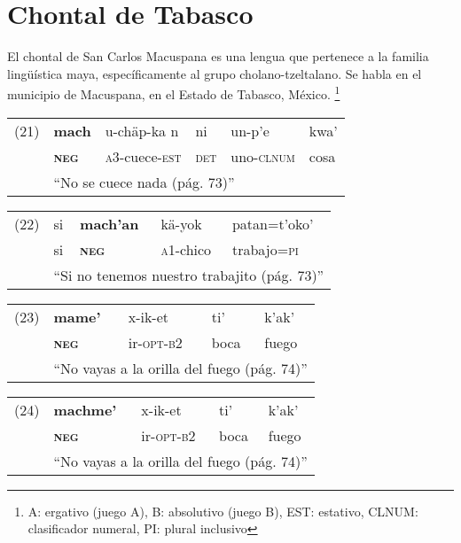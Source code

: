 \section*{Chontal de Tabasco}

\noindent El chontal de San Carlos Macuspana es una lengua que pertenece a la familia lingüística maya, específicamente al grupo cholano-tzeltalano. Se habla en el municipio de Macuspana, en el Estado de Tabasco, México.
\footnote{A: ergativo (juego A), B: absolutivo (juego B), EST: estativo, CLNUM: clasificador numeral, PI: plural inclusivo}
\vspace{0.5cm}

{\setmainfont{Charis SIL} 

\begin{tabular}{llllll}
(21) & \textbf{mach} & u-chäp-ka n& ni & un-p'e & kwa' \\
& \textsc{\textbf{neg}} & \textsc{a3}-cuece-\textsc{est} & \textsc{det} & uno-\textsc{clnum} & cosa \\
& \multicolumn{5}{l}{``No se cuece nada (pág. 73)''} \\
\end{tabular} \vspace{0.3cm}

\begin{tabular}{lllll}
(22) & si & \textbf{mach'an} & kä-yok  & patan=t'oko'\\
& si & \textsc{\textbf{neg}} & \textsc{a1}-chico & trabajo=\textsc{pi}\\
& \multicolumn{4}{l}{``Si no tenemos nuestro trabajito (pág. 73)''} \\
\end{tabular} \vspace{0.3cm}

\begin{tabular}{lllll}
(23) & \textbf{mame'} & x-ik-et & ti' & k'ak' \\
& \textsc{\textbf{neg}} & ir-\textsc{opt-b2} & boca & fuego\\
& \multicolumn{4}{l}{``No vayas a la orilla del fuego (pág. 74)''} \\
\end{tabular} \vspace{0.3cm}

\begin{tabular}{lllll}
(24) & \textbf{machme'} & x-ik-et & ti' & k'ak' \\
& \textsc{\textbf{neg}} & ir-\textsc{opt-b2} & boca & fuego\\
& \multicolumn{4}{l}{``No vayas a la orilla del fuego (pág. 74)''} \\
\end{tabular} \vspace{0.3cm}

}
